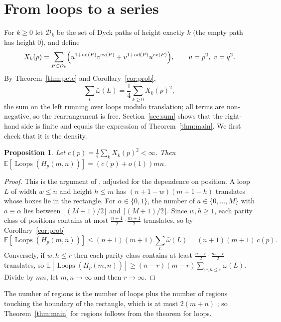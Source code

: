 \documentclass[11pt]{amsart}
\newtheorem{proposition}[theorem]{Proposition}
\theoremstyle{definition}
\theoremstyle{remark}
\newcommand{\Loops}{\operatorname{Loops}}
\newcommand{\E}{\mathbb{E}}
\newcommand{\ev}{\operatorname{ev}}
\newcommand{\od}{\operatorname{od}}
\begin{document}
\section{From loops to a series}\label{sec:series}

For $k\ge0$ let $\mathcal D_k$ be the set of Dyck paths of height exactly $k$ (the empty path has height
$0$), and define
\begin{equation}\label{eq:X}
X_k(p)=\sum_{P\in\mathcal D_k}\Bigl(u^{1+\od(P)}v^{\ev(P)}+v^{1+\od(P)}u^{\ev(P)}\Bigr),
\qquad u=p^2,\ v=q^2.
\end{equation}
By Theorem~\ref{thm:pete} and Corollary~\ref{cor:prob},
\begin{equation}\label{eq:c}
\sum_{L}\bar\omega(L)=\frac14\sum_{k\ge0}X_k(p)^2,
\end{equation}
the sum on the left running over loops modulo translation; all terms are non-negative, so the
rearrangement is free. Section~\ref{sec:sum} shows that the right-hand side is finite and equals the
expression of Theorem~\ref{thm:main}. We first check that it is the density.

\begin{proposition}\label{prop:density}
Let $c(p)=\frac14\sum_kX_k(p)^2<\infty$. Then $\E[\Loops(H_p(m,n))]=(c(p)+o(1))mn$.
\end{proposition}

\begin{proof}
This is the argument of \cite[Lemma~6.1]{DK24}, adjusted for the dependence on position. A loop $L$ of
width $w\le n$ and height $h\le m$ has $(n+1-w)(m+1-h)$ translates whose boxes lie in the rectangle. For
$\alpha\in\{0,1\}$, the number of $a\in\{0,\dots,M\}$ with $a\equiv\alpha$ lies between
$\lfloor(M+1)/2\rfloor$ and $\lceil(M+1)/2\rceil$. Since $w,h\ge1$, each parity class of positions
contains at most $\tfrac{n+1}{2}\cdot\tfrac{m+1}{2}$ translates, so by Corollary~\ref{cor:prob}
\[
\E[\Loops(H_p(m,n))]\le(n+1)(m+1)\sum_L\bar\omega(L)=(n+1)(m+1)\,c(p).
\]
Conversely, if $w,h\le r$ then each parity class contains at least $\tfrac{n-r}{2}\cdot\tfrac{m-r}{2}$
translates, so $\E[\Loops(H_p(m,n))]\ge(n-r)(m-r)\sum_{w,h\le r}\bar\omega(L)$. Divide by $mn$, let
$m,n\to\infty$ and then $r\to\infty$.
\end{proof}

The number of regions is the number of loops plus the number of regions touching the boundary of the
rectangle, which is at most $2(m+n)$ \cite[Section~6]{DK24}; so Theorem~\ref{thm:main} for regions
follows from the theorem for loops.
\end{document}
